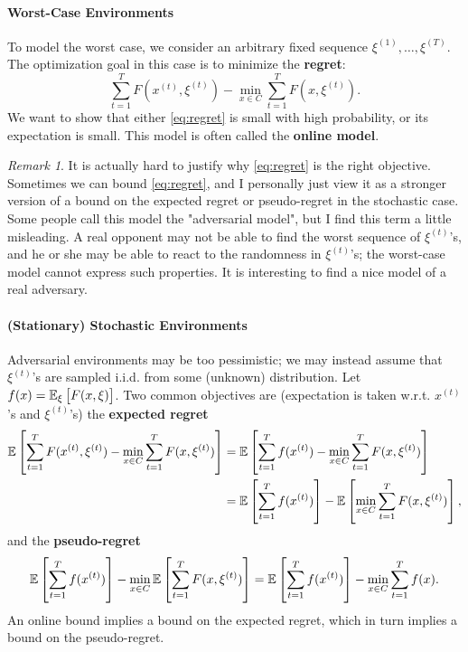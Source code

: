\documentclass[openany]{book}
\theoremstyle{definition}
\theoremstyle{remark}
\newtheorem*{remark}{Remark}
\begin{document}
\paragraph{Worst-Case Environments}
To model the worst case, we consider an arbitrary fixed sequence $\xi^{(1)},\ldots,\xi^{(T)}$. The optimization goal in this case is to minimize the \textbf{regret}:
\begin{equation}\label{eq:regret}
    \sum_{t=1}^{T}F(x^{(t)},\xi^{(t)})-\min_{x\in C}\sum_{t=1}^{T}F(x,\xi^{(t)}).
\end{equation}
We want to show that either \eqref{eq:regret} is small with high probability, or its expectation is small. This model is often called the \textbf{online model}.

\begin{remark}
    It is actually hard to justify why \eqref{eq:regret} is the right objective. Sometimes we can bound \eqref{eq:regret}, and I personally just view it as a stronger version of a bound on the expected regret or pseudo-regret in the stochastic case. Some people call this model the "adversarial model", but I find this term a little misleading. A real opponent may not be able to find the worst sequence of $\xi^{(t)}$'s, and he or she may be able to react to the randomness in $\xi^{(t)}$'s; the worst-case model cannot express such properties. It is interesting to find a nice model of a real adversary.
\end{remark}

\paragraph{(Stationary) Stochastic Environments}
Adversarial environments may be too pessimistic; we may instead assume that $\xi^{(t)}$'s are sampled i.i.d. from some (unknown) distribution. Let $f(x)=\mathbb{E}_{\xi}\sbr{F(x,\xi)}$. Two common objectives are (expectation is taken w.r.t. $x^{(t)}$'s and $\xi^{(t)}$'s) the \textbf{expected regret}
\begin{equation}\label{eq:expectRegret}
    \begin{split}
        \mathbb{E}\sbr{\sum_{t=1}^{T}F(x^{(t)},\xi^{(t)})-\min_{x\in C}\sum_{t=1}^{T}F(x,\xi^{(t)})} & = \mathbb{E}\sbr{\sum_{t=1}^{T}f(x^{(t)})-\min_{x\in C}\sum_{t=1}^{T}F(x,\xi^{(t)})} \\
         & =\mathbb{E}\sbr{\sum_{t=1}^{T}f(x^{(t)})}-\mathbb{E}\sbr{\min_{x\in C}\sum_{t=1}^{T}F(x,\xi^{(t)})},
    \end{split}
\end{equation}
and the \textbf{pseudo-regret}
\begin{equation}\label{eq:pseudoRegret}
    \mathbb{E}\sbr{\sum_{t=1}^{T}f(x^{(t)})}-\min_{x\in C}\mathbb{E}\sbr{\sum_{t=1}^{T}F(x,\xi^{(t)})}=\mathbb{E}\sbr{\sum_{t=1}^{T}f(x^{(t)})}-\min_{x\in C}\sum_{t=1}^{T}f(x).
\end{equation}
An online bound implies a bound on the expected regret, which in turn implies a bound on the pseudo-regret.
\end{document}
